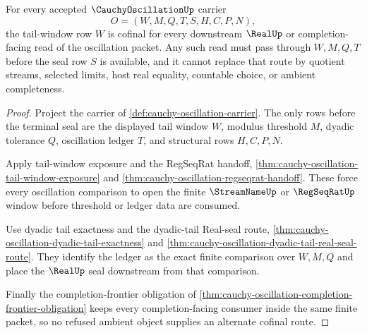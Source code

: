 \begin{theorem}
\label{thm:cauchy-oscillation-tail-window-cofinality}
For every accepted $\CauchyOscillationUp$ carrier
$$
O=(W,M,Q,T,S,H,C,P,N),
$$
the tail-window row $W$ is cofinal for every downstream $\RealUp$ or completion-facing read of the oscillation packet. Any such read must pass through $W,M,Q,T$ before the seal row $S$ is available, and it cannot replace that route by quotient streams, selected limits, host real equality, countable choice, or ambient completeness.
\end{theorem}
\begin{proof}
Project the carrier of \autoref{def:cauchy-oscillation-carrier}. The only rows before the terminal seal are the displayed tail window $W$, modulus threshold $M$, dyadic tolerance $Q$, oscillation ledger $T$, and structural rows $H,C,P,N$.

Apply tail-window exposure and the RegSeqRat handoff, \autoref{thm:cauchy-oscillation-tail-window-exposure} and \autoref{thm:cauchy-oscillation-regseqrat-handoff}. These force every oscillation comparison to open the finite $\StreamNameUp$ or $\RegSeqRatUp$ window before threshold or ledger data are consumed.

Use dyadic tail exactness and the dyadic-tail Real-seal route, \autoref{thm:cauchy-oscillation-dyadic-tail-exactness} and \autoref{thm:cauchy-oscillation-dyadic-tail-real-seal-route}. They identify the ledger as the exact finite comparison over $W,M,Q$ and place the $\RealUp$ seal downstream from that comparison.

Finally the completion-frontier obligation of \autoref{thm:cauchy-oscillation-completion-frontier-obligation} keeps every completion-facing consumer inside the same finite packet, so no refused ambient object supplies an alternate cofinal route.
\end{proof}

